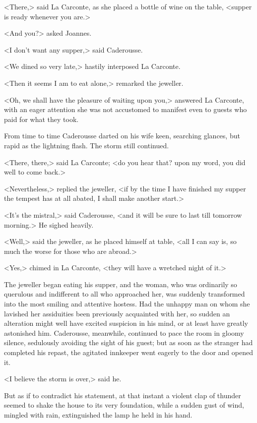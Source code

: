  <There,> said La Carconte, as she placed a bottle of wine on the table, <supper is ready whenever you are.> 

 <And you?> asked Joannes. 

 <I don't want any supper,> said Caderousse. 

 <We dined so very late,> hastily interposed La Carconte. 

 <Then it seems I am to eat alone,> remarked the jeweller. 

 <Oh, we shall have the pleasure of waiting upon you,> answered La Carconte, with an eager attention she was not accustomed to manifest even to guests who paid for what they took. 

 From time to time Caderousse darted on his wife keen, searching glances, but rapid as the lightning flash. The storm still continued. 

 <There, there,> said La Carconte; <do you hear that? upon my word, you did well to come back.> 

 <Nevertheless,> replied the jeweller, <if by the time I have finished my supper the tempest has at all abated, I shall make another start.> 

 <It's the mistral,> said Caderousse, <and it will be sure to last till tomorrow morning.> He sighed heavily. 

 <Well,> said the jeweller, as he placed himself at table, <all I can say is, so much the worse for those who are abroad.> 

 <Yes,> chimed in La Carconte, <they will have a wretched night of it.> 

 The jeweller began eating his supper, and the woman, who was ordinarily so querulous and indifferent to all who approached her, was suddenly transformed into the most smiling and attentive hostess. Had the unhappy man on whom she lavished her assiduities been previously acquainted with her, so sudden an alteration might well have excited suspicion in his mind, or at least have greatly astonished him. Caderousse, meanwhile, continued to pace the room in gloomy silence, sedulously avoiding the sight of his guest; but as soon as the stranger had completed his repast, the agitated innkeeper went eagerly to the door and opened it. 

 <I believe the storm is over,> said he. 

 But as if to contradict his statement, at that instant a violent clap of thunder seemed to shake the house to its very foundation, while a sudden gust of wind, mingled with rain, extinguished the lamp he held in his hand. 

